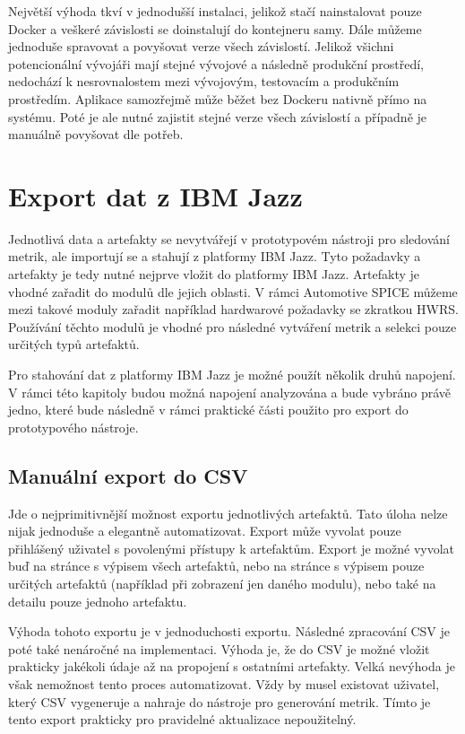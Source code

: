 \documentclass[czech,master]{diploma}
\begin{document}
Největší výhoda tkví v jednodušší instalaci, jelikož stačí nainstalovat pouze Docker a veškeré závislosti se doinstalují do kontejneru samy. Dále můžeme jednoduše spravovat a povyšovat verze všech závislostí. Jelikož všichni potencionální vývojáři mají stejné vývojové a následně produkční prostředí, nedochází k nesrovnalostem mezi vývojovým, testovacím a produkčním prostředím. Aplikace samozřejmě může běžet bez Dockeru nativně přímo na systému. Poté je ale nutné zajistit stejné verze všech závislostí a případně je manuálně povyšovat dle potřeb.



\section{Export dat z IBM Jazz}
\label{sec:ibm_export}

Jednotlivá data a artefakty se nevytvářejí v prototypovém nástroji pro sledování metrik, ale importují se a stahují z platformy IBM Jazz. Tyto požadavky a artefakty je tedy nutné nejprve vložit do platformy IBM Jazz. Artefakty je vhodné zařadit do modulů dle jejich oblasti. V rámci Automotive SPICE můžeme mezi takové moduly zařadit například hardwarové požadavky se zkratkou HWRS. Používání těchto modulů je vhodné pro následné vytváření metrik a selekci pouze určitých typů artefaktů.

Pro stahování dat z platformy IBM Jazz je možné použít několik druhů napojení. V rámci této kapitoly budou možná napojení analyzována a bude vybráno právě jedno, které bude následně v rámci praktické části použito pro export do prototypového nástroje.

\subsection{Manuální export do CSV}
Jde o nejprimitivnější možnost exportu jednotlivých artefaktů. Tato úloha nelze nijak jednoduše a elegantně automatizovat. Export může vyvolat pouze přihlášený uživatel s povolenými přístupy k artefaktům. Export je možné vyvolat buď na stránce s výpisem všech artefaktů, nebo na stránce s výpisem pouze určitých artefaktů (například při zobrazení jen daného modulu), nebo také na detailu pouze jednoho artefaktu.

Výhoda tohoto exportu je v jednoduchosti exportu. Následné zpracování CSV je poté také nenáročné na implementaci. Výhoda je, že do CSV je možné vložit prakticky jakékoli údaje až na propojení s ostatními artefakty. Velká nevýhoda je však nemožnost tento proces automatizovat. Vždy by musel existovat uživatel, který CSV vygeneruje a nahraje do nástroje pro generování metrik. Tímto je tento export prakticky pro pravidelné aktualizace nepoužitelný.
\end{document}
